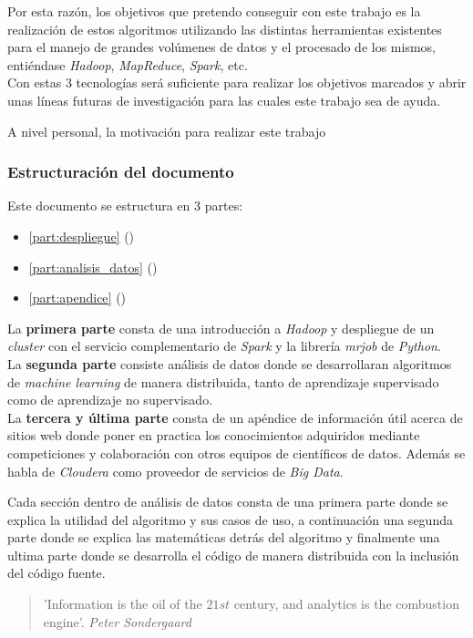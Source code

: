 Por esta razón, los objetivos que pretendo conseguir con este trabajo es la realización de estos 
algoritmos utilizando las distintas herramientas existentes para el manejo de grandes volúmenes de 
datos y el procesado de los mismos, entiéndase \textit{Hadoop}, \textit{MapReduce}, \textit{Spark}, etc.\\
Con estas 3 tecnologías será suficiente para realizar los objetivos marcados y abrir unas líneas futuras 
de investigación para las cuales este trabajo sea de ayuda.
\newline

A nivel personal, la motivación para realizar este trabajo

\subsubsection*{Estructuración del documento}
Este documento se estructura en 3 partes:
\begin{itemize}
  \item \autoref{part:despliegue} ()
  \item \autoref{part:analisis_datos} ()
  \item \autoref{part:apendice} ()
\end{itemize}
La \textbf{primera parte} consta de una introducción a \textit{Hadoop} y despliegue de un \textit{cluster} con el servicio
complementario de \textit{Spark} y la librería \textit{mrjob} de \textit{Python}.\\
La \textbf{segunda parte} consiste análisis de datos donde se desarrollaran algoritmos de 
\textit{machine learning} de manera distribuida, tanto de aprendizaje supervisado como de aprendizaje no supervisado.\\
La \textbf{tercera y última parte} consta de un apéndice de información útil acerca de sitios web 
donde poner en practica los conocimientos adquiridos mediante competiciones y colaboración con otros equipos de
científicos de datos. Además se habla de \textit{Cloudera} como proveedor de servicios de \textit{Big Data}.
\newline

Cada sección dentro de análisis de datos consta de una primera parte donde se explica la utilidad del algoritmo 
y sus casos de uso, a continuación una segunda parte donde se explica las matemáticas detrás del algoritmo y 
finalmente una ultima parte donde se desarrolla el código de manera distribuida con la inclusión del código fuente.

\vspace*{1.5cm}

\begin{quote}
    'Information is the oil of the $21st$ century, and analytics is the combustion engine'.
	 \newline \raggedleft \textit{Peter Sondergaard}
\end{quote}

\clearpage